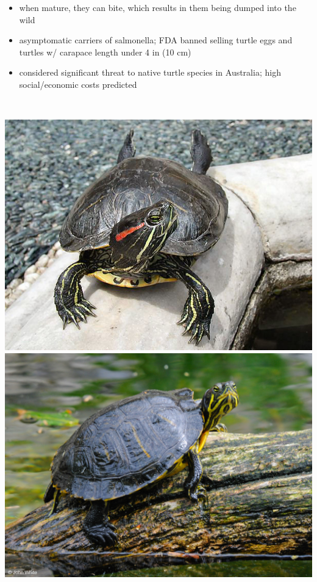 \begin{center}
\begin{longtabu}
\begin{itemize}[noitemsep]
		\item when mature, they can bite, which results in them being dumped into the wild
		\item asymptomatic carriers of salmonella; FDA banned selling turtle eggs and turtles w/ carapace length under 4 in (10 cm)
		\item considered significant threat to native turtle species in Australia; high social/economic costs predicted
	\end{itemize}
	\\
	\hline
\end{longtabu}
\includegraphics[scale=0.25]{testudines/emydidae/trachemys/1}
\includegraphics[scale=0.75]{testudines/emydidae/trachemys/2}
\end{center}